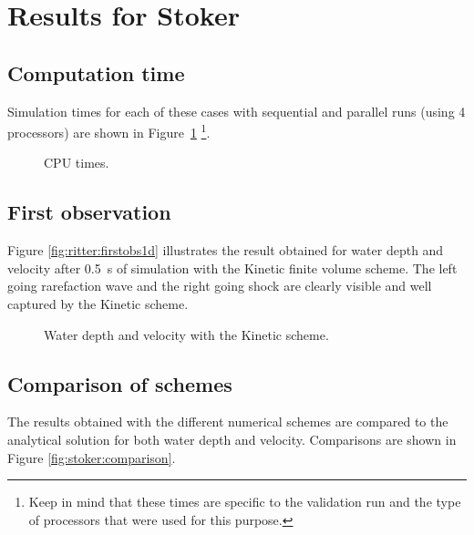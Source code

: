 \section{Results for Stoker}

\subsection{Computation time}

Simulation times for each of these cases with sequential and parallel runs
(using 4 processors) are shown in Figure~\ref{fig:stoker:cputime}
\footnote{Keep in mind that these times
are specific to the validation run and the type of processors that were used for this purpose.}.

\begin{figure}[h!]
  \centering
  \caption{CPU times.}\label{fig:stoker:cputime}
\end{figure}

\subsection{First observation}

Figure \ref{fig:ritter:firstobs1d} illustrates the result obtained for water
depth and velocity after 0.5~s of simulation with the Kinetic finite volume scheme.
The left going rarefaction wave and the right going shock are
clearly visible and well captured by the Kinetic scheme.

\begin{figure}[H]
\begin{minipage}[t]{0.5\textwidth}
 \centering
\end{minipage}
\begin{minipage}[t]{0.5\textwidth}
 \centering
\end{minipage}
  \caption{Water depth and velocity with the Kinetic scheme.}
  \label{fig:stoker:firstobs1d}
\end{figure}

\subsection{Comparison of schemes}

The results obtained with the different numerical schemes are compared to the
analytical solution for both water depth and velocity.
Comparisons are shown in Figure \ref{fig:stoker:comparison}.

